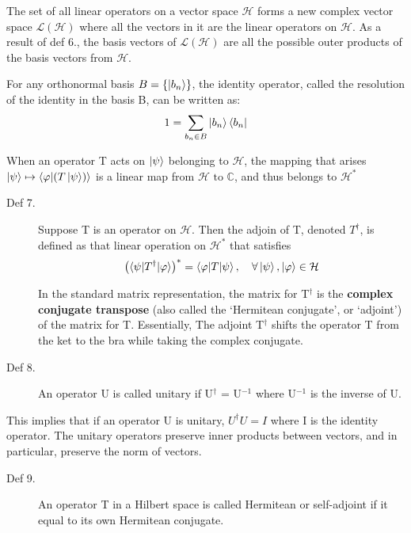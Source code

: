 \documentclass[12pt]{article}
\begin{document}
The set of all linear operators on a vector space \(\mathcal{H}\) forms a new complex vector space \(\mathcal{L(H)}\) where all the vectors in it are the linear operators on \(\mathcal{H}\). As a result of def 6., the basis vectors of \(\mathcal{L(H)}\) are all the possible outer products of the basis vectors from \(\mathcal{H}\).

For any orthonormal basis \(B = \{\ket{b_n}\}\), the identity operator, called the resolution of the identity in the basis B, can be written as:
\begin{equation}
    1 = \sum_{b_n \in B} \ket{b_n} \bra{b_n}
\end{equation}

When an operator T acts on \(\ket{\psi}\) belonging to \(\mathcal{H}\), the mapping that arises \( \ket{\psi} \mapsto \braket{\varphi | (T \ket{\psi})} \) is a linear map from \(\mathcal{H} \text{ to } \mathbb{C}\), and thus belongs to \(\mathcal{H^*}\)

\begin{description}
    \item[Def 7.] Suppose T is an operator on \(\mathcal{H}\). Then the adjoin of T, denoted \(T^\dagger\), is defined as that linear operation on \(\mathcal{H^*}\) that satisfies
    \begin{equation}
        \left( \braket{\psi | T^\dagger | \varphi} \right)^* = \braket{\varphi | T | \psi}, \quad \forall \ket{\psi}, \ket{\varphi} \in \mathcal{H}
    \end{equation}

    In the standard matrix representation, the matrix for T\(^\dagger\) is the \textbf{complex conjugate transpose} (also called the ‘Hermitean conjugate’, or ‘adjoint’) of the matrix for T. Essentially, The adjoint T\(^\dagger\) shifts the operator T from the ket to the bra while taking the complex conjugate.
\end{description}

\begin{description}
    \item[Def 8.] An operator U is called unitary if U\(^\dagger\) = U\(^{-1}\) where U\(^{-1}\) is the inverse of U.
\end{description}

This implies that if an operator U is unitary,  \(U^\dagger U = I\) where I is the identity operator. The unitary operators preserve inner products between vectors, and in particular, preserve the norm of vectors.

\begin{description}
    \item[Def 9.] An operator T in a Hilbert space is called Hermitean or self-adjoint if it equal to its own Hermitean conjugate. 
\end{description}
\end{document}
